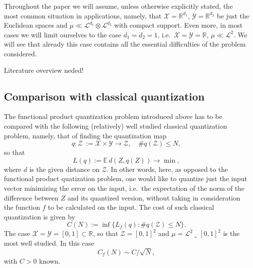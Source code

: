 \documentclass{amsart}
\theoremstyle{remark}
\numberwithin{equation}{section}
\numberwithin{figure}{section}
\newcommand{\R}{\mathbb{R}}
\def\mX{\mathcal{X}}
\def\mY{\mathcal{Y}}
\newcommand{\res}{\llcorner}
\begin{document}
Throughout the paper we will assume, unless otherwise explicitly stated, the most common situation in applications, namely,  that $\mX=\R^{d_1}$, $\mY=\R^{d_2}$ be just the Euclidean spaces and 
$\mu\ll \mathcal{L}^{d_1}\otimes \mathcal{L}^{d_2}$ with compact support. Even more, in most cases we will limit ourselves to the case
$d_1=d_2=1$, i.e.\   $\mX = \mY =\R$, $\mu\ll \mathcal{L}^2$. We will see that already this case contains all the essential difficulties of the problem considered.
%	

{\color{red} Literature overview neded!}

\subsection{Comparison with classical quantization}
The functional product quantization problem introduced above has to be compared with the following (relatively) well studied classical quantization 
problem, namely, that of finding the quantization map
\[q\colon \mathcal{Z}\ :=\mX \times \mY\to \mathcal{Z}, \quad \#q(\mathcal{Z})\leq N,\]
so that
\[
L(q):=\mathbb{E}\, d\left( Z, q(Z)\right) \to\min,
\]
where $d$ is the given distance on $\mathcal{Z}$.
In other words, here,  as opposed to the functional product quatization problem, one would like to 
quantize just the input vector minimizing the error on the input, i.e.\ the expectation of the norm of the difference between $Z$ and its quantized version, without taking in consideration the function $f$ to be calculated on the input.
The cost of such classical quantization is given by
\[
C(N):= \inf \{ L_f(q)\colon \#q(\mathcal{Z})\leq N\}.
\]
The case $\mX=\mY=[0,1]\subset \R$, so that $\mathcal{Z}= [0,1]^2$ and $\mu=\mathcal{L}^2\res [0,1]^2$ is the most well studied. In this case
\[
C_f(N) \sim C/\sqrt{N},
\]
with $C>0$ known.
\end{document}
